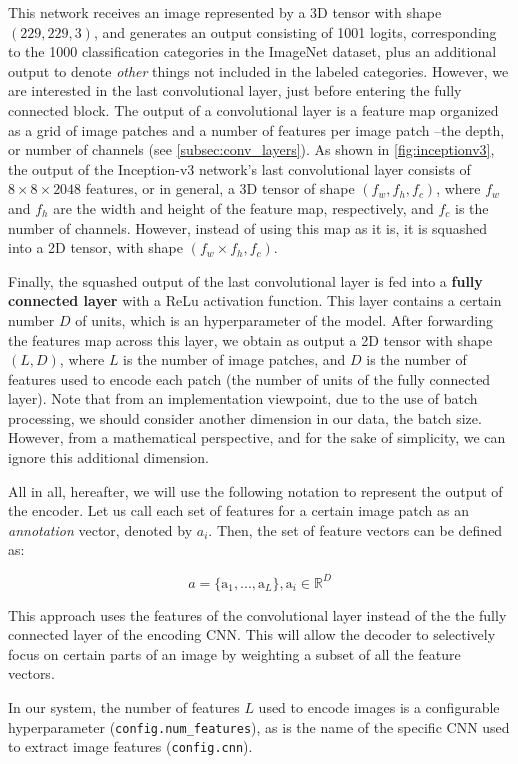 This network receives an image represented by a 3D tensor with shape $(229, 229, 3)$, and generates an output consisting of 1001 logits, corresponding to the 1000 classification categories in the ImageNet dataset, plus an additional output to denote \textit{other} things not included in the labeled categories. However, we are interested in the last convolutional layer, just before entering the fully connected block. The output of a convolutional layer is a feature map organized as a grid of image patches and a number of features per image patch --the depth, or number of channels (see \cref{subsec:conv_layers}). As shown in \cref{fig:inceptionv3}, the output of the Inception-v3 network's last convolutional layer consists of $8 \times 8 \times 2048$ features, or in general, a 3D tensor of shape $(f_w, f_h, f_c)$, where $f_w$ and $f_h$ are the width and height of the feature map, respectively, and $f_c$ is the number of channels. However, instead of using this map as it is, it is squashed into a 2D tensor, with shape $(f_w \times f_h, f_c)$.

Finally, the squashed output of the last convolutional layer is fed into a \textbf{fully connected layer} with a ReLu activation function. This layer contains a certain number $D$ of units, which is an hyperparameter of the model. After forwarding the features map across this layer, we obtain as output a 2D tensor with shape $(L, D)$, where $L$ is the number of image patches, and $D$ is the number of features used to encode each patch (the number of units of the fully connected layer). Note that from an implementation viewpoint, due to the use of batch processing, we should consider another dimension in our data, the batch size. However, from a mathematical perspective, and for the sake of simplicity, we can ignore this additional dimension. 

All in all, hereafter, we will use the following notation to represent the output of the encoder. 
Let us call each set of features for a certain image patch as an \textit{annotation} vector, denoted by $a_i$. Then, the set of feature vectors can be defined as:

$$a = \{\text{a}_1,...,\text{a}_L \}, \text{a}_i \in \mathbb{R}^D$$

This approach uses the features of the convolutional layer instead of the the fully connected layer of the encoding CNN. This will allow the decoder to selectively focus on certain parts of an image by weighting a subset of all the feature vectors.

In our system, the number of features $L$ used to encode images is a configurable hyperparameter (\lstinline{config.num_features}), as is the name of the specific CNN used to extract image features (\lstinline{config.cnn}).

